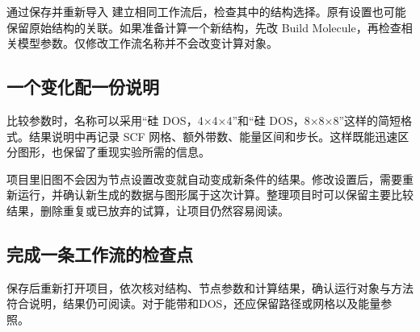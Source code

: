 通过保存并重新导入  建立相同工作流后，检查其中的结构选择。原有设置也可能保留原始结构的关联。如果准备计算一个新结构，先改 Build Molecule，再检查相关模型参数。仅修改工作流名称并不会改变计算对象。

\subsection{一个变化配一份说明}

比较参数时，名称可以采用“硅 DOS，4×4×4”和“硅 DOS，8×8×8”这样的简短格式。结果说明中再记录 SCF 网格、额外带数、能量区间和步长。这样既能迅速区分图形，也保留了重现实验所需的信息。

项目里旧图不会因为节点设置改变就自动变成新条件的结果。修改设置后，需要重新运行，并确认新生成的数据与图形属于这次计算。整理项目时可以保留主要比较结果，删除重复或已放弃的试算，让项目仍然容易阅读。

\subsection{完成一条工作流的检查点}

保存后重新打开项目，依次核对结构、节点参数和计算结果，确认运行对象与方法符合说明，结果仍可阅读。对于能带和DOS，还应保留路径或网格以及能量参照。
